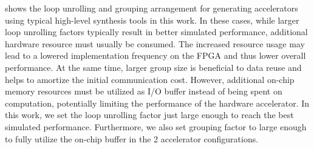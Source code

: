  shows the loop unrolling and grouping arrangement for
generating accelerators using typical high-level synthesis tools in this work. In these cases, while
larger loop unrolling factors typically result in better simulated performance, additional
hardware resource must usually be consumed. The increased resource usage may lead to a lowered
implementation frequency on the FPGA and thus lower overall performance. At the same time, larger
group size is beneficial to data reuse and helps to amortize the initial communication cost.
However, additional on-chip memory resources must be utilized as I/O buffer instead of being spent
on computation, potentially limiting the performance of the hardware accelerator. In this work, we
set the loop unrolling factor just large enough to reach the best simulated performance.
Furthermore, we also set grouping factor to large enough to fully utilize the on-chip buffer in the
2 accelerator configurations. 

